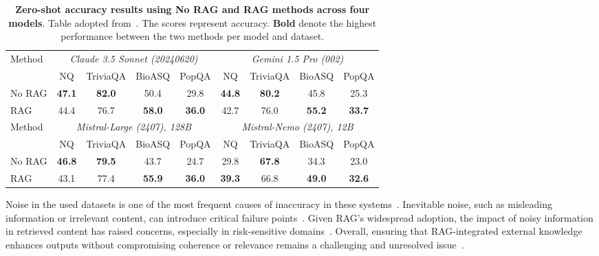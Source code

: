 \documentclass{DESSThesis}
\begin{document}
\begin{table}[h]
    \centering
    \small
    \setlength{\tabcolsep}{4pt}
    \begin{tabular}{l@{\hskip 8pt}cccc|cccc}
        \toprule
         Method & \multicolumn{4}{c|}{\cellcolor{gray!15}\textit{Claude 3.5 Sonnet (20240620)}} & \multicolumn{4}{c}{\cellcolor{gray!15}\textit{Gemini 1.5 Pro (002)}} \\ \cmidrule(lr){2-5} \cmidrule(lr){6-9}
         & NQ & TriviaQA & BioASQ & PopQA & NQ & TriviaQA & BioASQ & PopQA \\ \midrule
        No RAG   & \textbf{47.1} & \textbf{82.0} & 50.4 & 29.8 & \textbf{44.8} & \textbf{80.2} & 45.8 & 25.3 \\ 
        RAG    & 44.4 & 76.7 & \textbf{58.0} & \textbf{36.0} & 42.7 & 76.0 & \textbf{55.2} & \textbf{33.7} \\ \midrule
         Method & \multicolumn{4}{c|}{\cellcolor{gray!15}\textit{Mistral-Large (2407), 128B}} & \multicolumn{4}{c}{\cellcolor{gray!15}\textit{Mistral-Nemo (2407), 12B}} \\ \cmidrule(lr){2-5} \cmidrule(lr){6-9}
         & NQ & TriviaQA & BioASQ & PopQA & NQ & TriviaQA & BioASQ & PopQA \\ \midrule
        No RAG & \textbf{46.8} & \textbf{79.5} & 43.7 & 24.7 & 29.8 & \textbf{67.8} & 34.3 & 23.0 \\ 
        RAG & 43.1 & 77.4 & \textbf{55.9} & \textbf{36.0} & \textbf{39.3} & 66.8 & \textbf{49.0} & \textbf{32.6} \\ 
        \bottomrule
    \end{tabular}
    \caption[Zero-shot accuracy results using No RAG and RAG methods across four models]{\textbf{Zero-shot accuracy results using No RAG and RAG methods across four models}. Table adopted from~\cite{wang2025astuteragovercomingimperfect}. The scores represent accuracy. \textbf{Bold} denote the highest performance between the two methods per model and dataset.}
    \label{tab:norag_rag_adapted}
\end{table}

Noise in the used datasets is one of the most frequent causes of inaccuracy in these systems~\cite{10921633}. Inevitable noise, such as misleading information or irrelevant content, can introduce critical failure points~\cite{zhao2024retrievalaugmentedgenerationaigeneratedcontent}. Given RAG's widespread adoption, the impact of noisy information in retrieved content has raised concerns, especially in risk-sensitive domains~\cite{wang2025astuteragovercomingimperfect}. Overall, ensuring that RAG-integrated external knowledge enhances outputs without compromising coherence or relevance remains a challenging and unresolved issue~\cite{10921633}.
\end{document}
